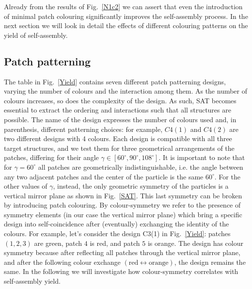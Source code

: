 \documentclass[a4paper, amsfonts, amssymb, amsmath, reprint, showkeys, nofootinbib, oneside]{revtex4-1}
\begin{document}
Already from the results of Fig.~\ref{N1c2} we can assert that even the introduction of minimal patch colouring significantly improves the self-assembly process. In the next section we will look in detail the effects of different colouring patterns on the yield of self-assembly.


\subsection{Patch patterning}

The table in Fig.~\ref{Yield} contains seven different patch patterning designs, varying the number of colours and the interaction among them. As the number of colours increases, so does the complexity of the design. As such, SAT becomes essential to extract the ordering and interactions such that all structures are possible. The name of the design expresses the number of colours used and, in parenthesis, different patterning choices: for example, $C4(1)$ and $C4(2)$ are two different designs with 4 colours. Each design is compatible with all three target structures, and we test them for three geometrical arrangements of the patches, differing for their angle $\gamma\in [60^\circ, 90^\circ, 108^\circ]$. It is important to note that for $\gamma=60^\circ$ all patches are geometrically indistinguishable, i.e. the angle between any two adjacent patches and the center of the particle is the same $60^\circ$. For the other values of $\gamma$, instead, the only geometric symmetry of the particles is a vertical mirror plane as shown in Fig.~\ref{SAT}. This last symmetry can be broken by introducing patch colouring. By colour-symmetry we refer to the presence of symmetry elements (in our case the vertical mirror plane) which bring a specific design into self-coincidence after (eventually) exchanging the identity of the colours. For example, let's consider the design C3(1) in Fig.~\ref{Yield}: patches $(1,2,3)$ are green, patch $4$ is red, and patch $5$ is orange. The design has colour symmetry because after reflecting all patches through the vertical mirror plane, and after the following colour exchange $(\text{red}\leftrightarrow\text{orange})$, the design remains the same.
In the following we will investigate how colour-symmetry correlates with self-assembly yield.
\end{document}
